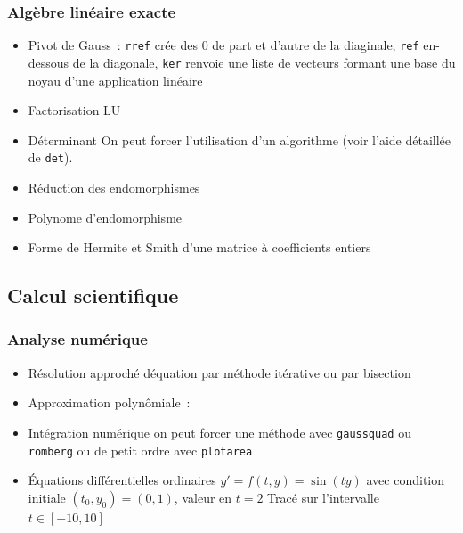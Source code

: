 \documentclass[a4paper,11pt]{article}
\begin{document}
\begin{giacjshere}
\subsubsection{Alg\`ebre lin\'eaire exacte}
\begin{itemize}
\item Pivot de Gauss~: \verb|rref| cr\'ee des 0 de part et d'autre
de la diaginale, \verb|ref| en-dessous de la diagonale,
\verb|ker| renvoie une liste de vecteurs formant une 
base du noyau d'une application lin\'eaire
\item Factorisation LU
\item D\'eterminant
On peut forcer l'utilisation d'un algorithme 
(voir l'aide d\'etaill\'ee de \verb|det|).
\item R\'eduction des endomorphismes
\item Polynome d'endomorphisme
\item Forme de Hermite et Smith d'une matrice \`a coefficients entiers
\end{itemize}

\subsection{Calcul scientifique}
\subsubsection{Analyse num\'erique}
\begin{itemize}
\item R\'esolution approch\'e d\'equation par m\'ethode it\'erative
ou par bisection
\item Approximation polyn\^omiale~: 
\item Int\'egration num\'erique
on peut forcer une m\'ethode avec \verb|gaussquad| ou \verb|romberg|
ou de petit ordre avec \verb|plotarea|
\item \'Equations diff\'erentielles ordinaires
$y'=f(t,y)=\sin(ty)$ 
avec condition initiale $(t_0,y_0)=(0,1)$, valeur en $t=2$
Trac\'e sur l'intervalle $t \in [-10,10]$
\end{itemize}



\end{giacjshere}
\end{document}
